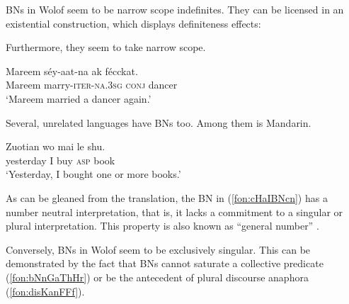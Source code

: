 \documentclass[output=paper]{langscibook}
\begin{document}
BNs in Wolof seem to be narrow scope indefinites. They can be licensed in an existential construction, which displays definiteness effects:
		
		\ea
			\label{fon:dogsgard}
			\z
		\z

\noindent   Furthermore, they seem to take narrow scope.
		
		\ea \gll	Mareem s\'{e}y-aat-na ak {f\'{e}cckat}.\\
		Mareem marry-\textsc{iter}-\textsc{na.3sg} \textsc{conj} dancer\\
		\glt    `Mareem married a dancer again.'\label{fon:aAtBAyzZBnN}
		\sn {}
		    \label{fon:aAtBAyzZBnN1}
			\label{fon:aAtBAyzZBnN2}
			\z
		\z\label{fon:aAtBAyzZBnNOwlL}
		
\noindent Several, unrelated languages have BNs too. Among them is Mandarin.
		
    		\ea \gll	Zuotian wo mai le {shu}.\\
				yesterday I buy \textsc{asp} book\\
				\glt    `Yesterday, I bought one or more books.'
                \label{fon:cHaIBNcn}
		\z
		
\noindent   As can be gleaned from the translation, the BN in (\ref{fon:cHaIBNcn}) has a number neutral interpretation, that is, it lacks a commitment to a singular or plural interpretation. This property is also known as ``general number'' \citep{corbettNumber}. 
		
Conversely, BNs in Wolof seem to be exclusively singular. This can be demonstrated by the fact that BNs cannot saturate a collective predicate (\ref{fon:bNnGaThHr}) or be the antecedent of plural discourse anaphora (\ref{fon:disKanFFf}).
		
\end{document}
